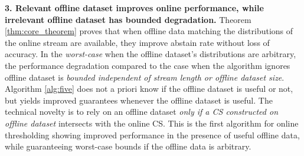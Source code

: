 {\textbf{3. Relevant offline dataset improves online performance, while irrelevant offline dataset has bounded degradation.} Theorem \ref{thm:core_theorem} proves that when offline data matching the distributions of the online stream are available, they improve abstain rate without loss of accuracy. In the \emph{worst-case} when the offline dataset's distributions are arbitrary, the performance degradation compared to the case when the algorithm ignores offline dataset is \emph{bounded independent of stream length or offline dataset size}. Algorithm \ref{alg:five} does not a priori know if the offline dataset is useful or not, but yields improved guarantees whenever the offline dataset is useful. The technical novelty is to rely on an offline dataset \emph{only if a CS constructed on offline dataset} intersects with the online CS. This is the first algorithm for online thresholding showing improved  performance in the presence of useful offline data, while guaranteeing worst-case bounds if the offline data is arbitrary. 


}


